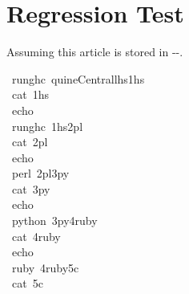 \documentclass[12pt]{article}
\begin{document}
\section{Regression Test}
Assuming this article is stored in --.
\begin{tabbing}\ttfamily
~runghc~quineCentrallhs1hs\\
\ttfamily ~cat~1hs\\
\ttfamily ~echo~\\
\ttfamily ~runghc~1hs2pl\\
\ttfamily ~cat~2pl\\
\ttfamily ~echo~\\
\ttfamily ~perl~2pl3py\\
\ttfamily ~cat~3py\\
\ttfamily ~echo~\\
\ttfamily ~python~3py4ruby\\
\ttfamily ~cat~4ruby\\
\ttfamily ~echo~\\
\ttfamily ~ruby~4ruby5c\\
\ttfamily ~cat~5c\\

\end{tabbing}
\end{document}
